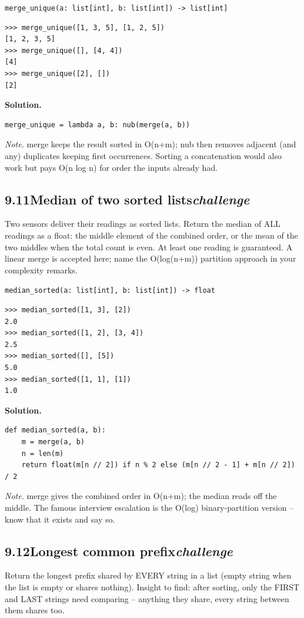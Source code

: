 \documentclass[10pt,letterpaper]{book}
\begin{document}
\noindent\texttt{merge\_unique(a: list[int], b: list[int]) -> list[int]}
\begin{lstlisting}[style=ex]
>>> merge_unique([1, 3, 5], [1, 2, 5])
[1, 2, 3, 5]
>>> merge_unique([], [4, 4])
[4]
>>> merge_unique([2], [])
[2]
\end{lstlisting}
\noindent\textbf{Solution.}
\begin{lstlisting}[style=code]
merge_unique = lambda a, b: nub(merge(a, b))
\end{lstlisting}
\noindent\textit{Note.} merge keeps the result sorted in O(n+m); nub then removes adjacent (and any) duplicates keeping first occurrences. Sorting a concatenation would also work but pays O(n log n) for order the inputs already had.

\subsection*{9.11\quad Median of two sorted lists\hfill\textnormal{\textit{challenge}}}
Two sensors deliver their readings as sorted lists. Return the median of ALL readings as a float: the middle element of the combined order, or the mean of the two middles when the total count is even. At least one reading is guaranteed. A linear merge is accepted here; name the O(log(n+m)) partition approach in your complexity remarks.

\noindent\texttt{median\_sorted(a: list[int], b: list[int]) -> float}
\begin{lstlisting}[style=ex]
>>> median_sorted([1, 3], [2])
2.0
>>> median_sorted([1, 2], [3, 4])
2.5
>>> median_sorted([], [5])
5.0
>>> median_sorted([1, 1], [1])
1.0
\end{lstlisting}
\noindent\textbf{Solution.}
\begin{lstlisting}[style=code]
def median_sorted(a, b):
    m = merge(a, b)
    n = len(m)
    return float(m[n // 2]) if n % 2 else (m[n // 2 - 1] + m[n // 2]) / 2
\end{lstlisting}
\noindent\textit{Note.} merge gives the combined order in O(n+m); the median reads off the middle. The famous interview escalation is the O(log) binary-partition version -- know that it exists and say so.

\subsection*{9.12\quad Longest common prefix\hfill\textnormal{\textit{challenge}}}
Return the longest prefix shared by EVERY string in a list (empty string when the list is empty or shares nothing). Insight to find: after sorting, only the FIRST and LAST strings need comparing -- anything they share, every string between them shares too.
\end{document}
